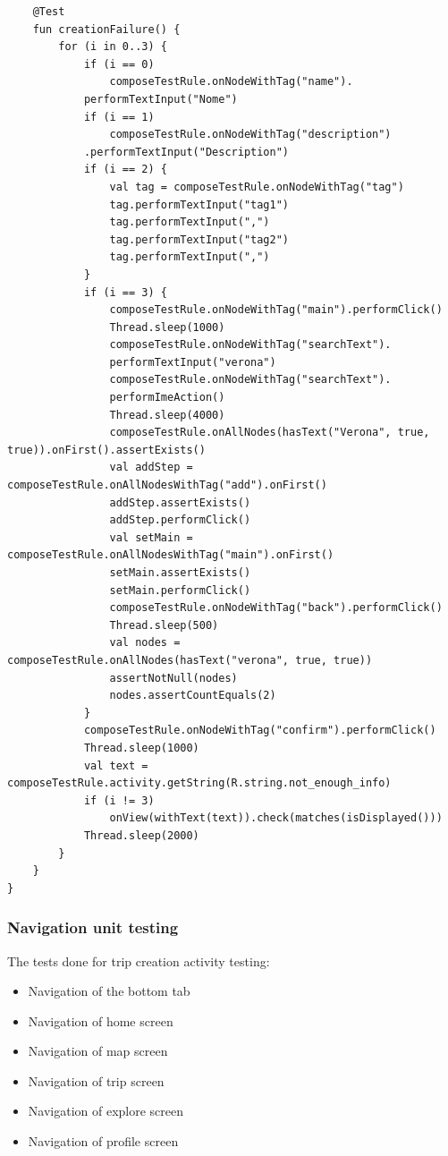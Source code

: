 \begin{verbatim}
    @Test
    fun creationFailure() {
        for (i in 0..3) {
            if (i == 0)
                composeTestRule.onNodeWithTag("name").
            performTextInput("Nome")
            if (i == 1)
                composeTestRule.onNodeWithTag("description")
            .performTextInput("Description")
            if (i == 2) {
                val tag = composeTestRule.onNodeWithTag("tag")
                tag.performTextInput("tag1")
                tag.performTextInput(",")
                tag.performTextInput("tag2")
                tag.performTextInput(",")
            }
            if (i == 3) {
                composeTestRule.onNodeWithTag("main").performClick()
                Thread.sleep(1000)
                composeTestRule.onNodeWithTag("searchText").
                performTextInput("verona")
                composeTestRule.onNodeWithTag("searchText").
                performImeAction()
                Thread.sleep(4000)
                composeTestRule.onAllNodes(hasText("Verona", true, true)).onFirst().assertExists()
                val addStep = composeTestRule.onAllNodesWithTag("add").onFirst()
                addStep.assertExists()
                addStep.performClick()
                val setMain = composeTestRule.onAllNodesWithTag("main").onFirst()
                setMain.assertExists()
                setMain.performClick()
                composeTestRule.onNodeWithTag("back").performClick()
                Thread.sleep(500)
                val nodes = composeTestRule.onAllNodes(hasText("verona", true, true))
                assertNotNull(nodes)
                nodes.assertCountEquals(2)
            }
            composeTestRule.onNodeWithTag("confirm").performClick()
            Thread.sleep(1000)
            val text = composeTestRule.activity.getString(R.string.not_enough_info)
            if (i != 3)
                onView(withText(text)).check(matches(isDisplayed()))
            Thread.sleep(2000)
        }
    }
}

\end{verbatim}

\subsubsection{Navigation unit testing}
The tests done for trip creation activity testing:
\begin{itemize}
\item Navigation of the bottom tab
\item Navigation of home screen
\item Navigation of map screen
\item Navigation of trip screen
\item Navigation of explore screen
\item Navigation of profile screen
\end{itemize}

